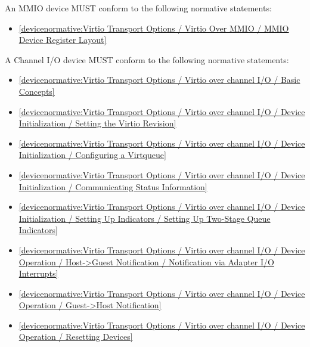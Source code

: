 \label{sec:Conformance / Device Conformance / MMIO Device Conformance}

An MMIO device MUST conform to the following normative statements:

\begin{itemize}
\item \ref{devicenormative:Virtio Transport Options / Virtio Over MMIO / MMIO Device Register Layout}
\end{itemize}

\label{sec:Conformance / Device Conformance / Channel I/O Device Conformance}

A Channel I/O device MUST conform to the following normative statements:

\begin{itemize}
\item \ref{devicenormative:Virtio Transport Options / Virtio over channel I/O / Basic Concepts}
\item \ref{devicenormative:Virtio Transport Options / Virtio over channel I/O / Device Initialization / Setting the Virtio Revision}
\item \ref{devicenormative:Virtio Transport Options / Virtio over channel I/O / Device Initialization / Configuring a Virtqueue}
\item \ref{devicenormative:Virtio Transport Options / Virtio over channel I/O / Device Initialization / Communicating Status Information}
\item \ref{devicenormative:Virtio Transport Options / Virtio over channel I/O / Device Initialization / Setting Up Indicators / Setting Up Two-Stage Queue Indicators}
\item \ref{devicenormative:Virtio Transport Options / Virtio over channel I/O / Device Operation / Host->Guest Notification / Notification via Adapter I/O Interrupts}
\item \ref{devicenormative:Virtio Transport Options / Virtio over channel I/O / Device Operation / Guest->Host Notification}
\item \ref{devicenormative:Virtio Transport Options / Virtio over channel I/O / Device Operation / Resetting Devices}
\end{itemize}

